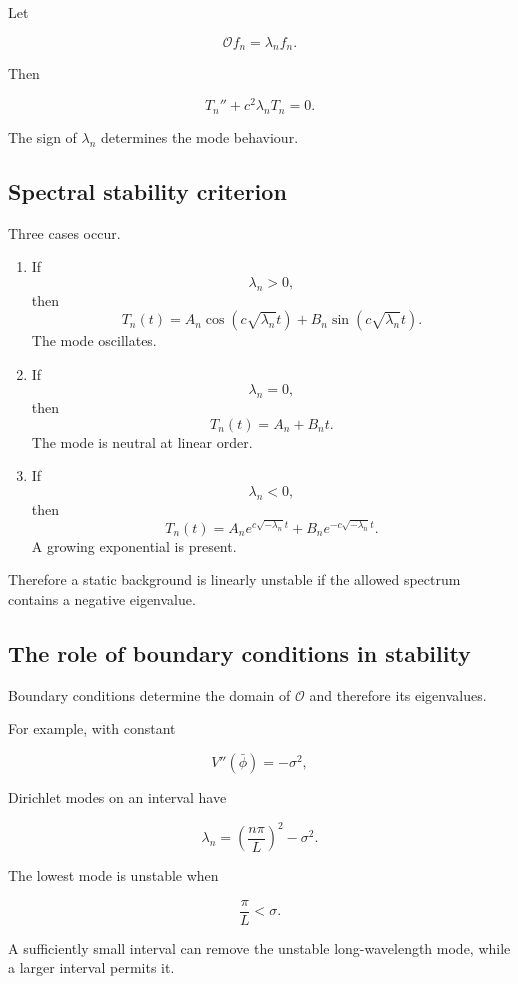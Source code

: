 Let

\[
\boxed{
\mathcal{O}f_{n}
=
\lambda_{n}f_{n}
}.
\]

Then

\[
T_{n}''
+
c^{2}\lambda_{n}T_{n}
=0.
\]

The sign of \(\lambda_{n}\) determines the mode behaviour.

\subsection{Spectral stability criterion}

Three cases occur.

\begin{enumerate}
    \item If
    \[
    \lambda_{n}>0,
    \]
    then
    \[
    T_{n}(t)
    =
    A_{n}\cos(c\sqrt{\lambda_{n}}t)
    +
    B_{n}\sin(c\sqrt{\lambda_{n}}t).
    \]
    The mode oscillates.

    \item If
    \[
    \lambda_{n}=0,
    \]
    then
    \[
    T_{n}(t)=A_{n}+B_{n}t.
    \]
    The mode is neutral at linear order.

    \item If
    \[
    \lambda_{n}<0,
    \]
    then
    \[
    T_{n}(t)
    =
    A_{n}e^{c\sqrt{-\lambda_{n}}t}
    +
    B_{n}e^{-c\sqrt{-\lambda_{n}}t}.
    \]
    A growing exponential is present.
\end{enumerate}

Therefore a static background is linearly unstable if the allowed spectrum contains a negative eigenvalue.

\subsection{The role of boundary conditions in stability}

Boundary conditions determine the domain of \(\mathcal{O}\) and therefore its eigenvalues.

For example, with constant

\[
V''(\bar\phi)=-\sigma^{2},
\]

Dirichlet modes on an interval have

\[
\lambda_{n}
=
\left(
\frac{n\pi}{L}
\right)^{2}
-
\sigma^{2}.
\]

The lowest mode is unstable when

\[
\boxed{
\frac{\pi}{L}<\sigma
}.
\]

A sufficiently small interval can remove the unstable long-wavelength mode, while a larger interval permits it.

